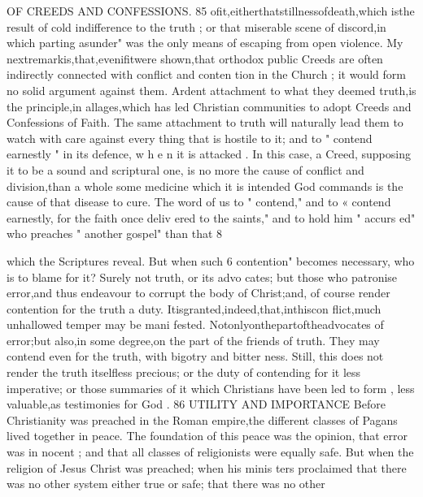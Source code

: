 \documentclass[
]{book}
\begin{document}
OF CREEDS AND CONFESSIONS. 85
ofit,eitherthatstillnessofdeath,which isthe
result of cold indifference to the truth ; or that
miserable scene of discord,in which parting
asunder" was the only means of escaping from open violence.
My nextremarkis,that,evenifitwere shown,that orthodox public Creeds are often indirectly connected with conflict and conten
tion in the Church ; it would form no solid
argument against them. Ardent attachment
to what they deemed truth,is the principle,in
allages,which has led Christian communities
to adopt Creeds and Confessions of Faith.
The same attachment to truth will naturally lead them to watch with care against every
thing that is hostile to it; and to " contend earnestly " in its defence, w h e n it is attacked .
In this case, a Creed, supposing it to be a sound and scriptural one, is no
more the cause of conflict and division,than a whole
some medicine which it is intended
God commands
is the cause of that disease to cure. The word of us to " contend," and to
« contend earnestly, for the faith once deliv ered to the saints," and to hold him " accurs
ed" who preaches " another gospel" than that
8

which the Scriptures reveal. But when such 6 contention" becomes necessary, who is to
blame for it? Surely not truth, or its advo cates; but those who patronise error,and thus
endeavour to corrupt the body of Christ;and, of course render contention for the truth a
duty. Itisgranted,indeed,that,inthiscon flict,much unhallowed temper may be mani fested. Notonlyonthepartoftheadvocates of error;but also,in some degree,on the part of the friends of truth. They may contend even for the truth, with bigotry and bitter ness. Still, this does not render the truth
itselfless precious; or the duty of contending for it less imperative; or those summaries of it which Christians have been led to form , less valuable,as testimonies for God .
86 UTILITY AND IMPORTANCE
Before Christianity was preached in the
Roman empire,the different classes of Pagans lived together in peace. The foundation of
this peace was the opinion, that error was in nocent ; and that all classes of religionists were equally safe. But when the religion of Jesus Christ was preached; when his minis ters proclaimed that there was no other system
either true or safe; that there was no other
\end{document}
